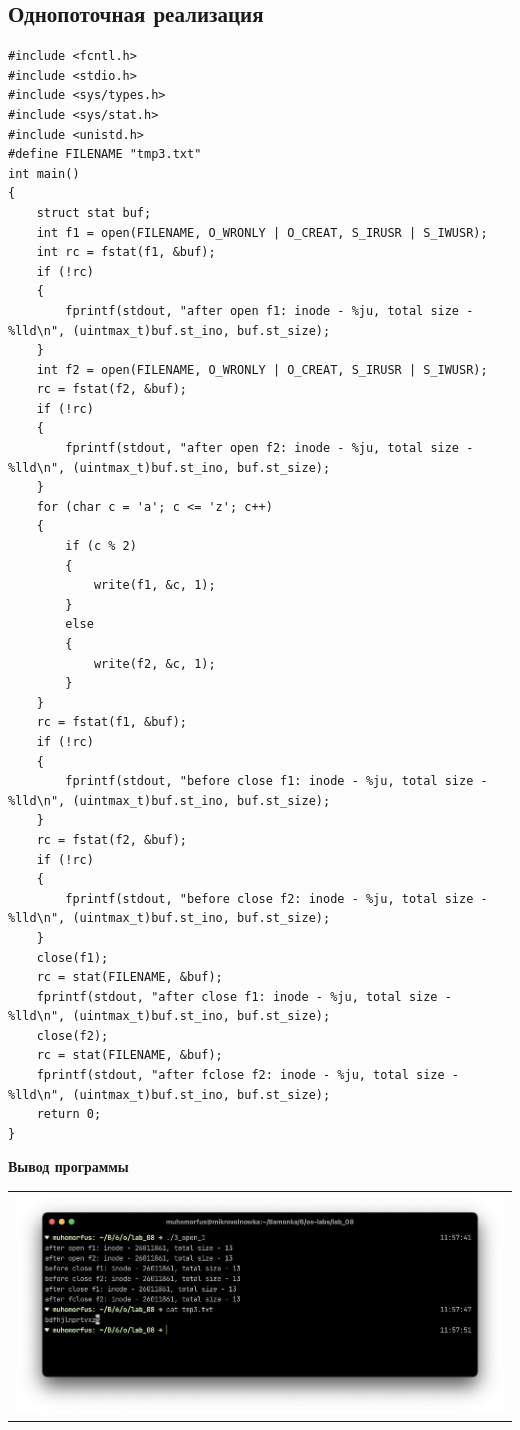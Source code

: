 \subsection{Однопоточная реализация}

\begin{lstlisting}
#include <fcntl.h>
#include <stdio.h> 
#include <sys/types.h> 
#include <sys/stat.h>
#include <unistd.h>
#define FILENAME "tmp3.txt"
int main()
{
	struct stat buf;
	int f1 = open(FILENAME, O_WRONLY | O_CREAT, S_IRUSR | S_IWUSR);
	int rc = fstat(f1, &buf);
	if (!rc)
	{
		fprintf(stdout, "after open f1: inode - %ju, total size - %lld\n", (uintmax_t)buf.st_ino, buf.st_size);
	}
	int f2 = open(FILENAME, O_WRONLY | O_CREAT, S_IRUSR | S_IWUSR);
	rc = fstat(f2, &buf);
	if (!rc)
	{
		fprintf(stdout, "after open f2: inode - %ju, total size - %lld\n", (uintmax_t)buf.st_ino, buf.st_size);
	}
	for (char c = 'a'; c <= 'z'; c++)
	{
		if (c % 2)
		{
			write(f1, &c, 1);
		}
		else
		{
			write(f2, &c, 1); 
		}
	}
	rc = fstat(f1, &buf);
	if (!rc)
	{
		fprintf(stdout, "before close f1: inode - %ju, total size - %lld\n", (uintmax_t)buf.st_ino, buf.st_size);
	}
	rc = fstat(f2, &buf);
	if (!rc)
	{
		fprintf(stdout, "before close f2: inode - %ju, total size - %lld\n", (uintmax_t)buf.st_ino, buf.st_size);
	}
	close(f1);
	rc = stat(FILENAME, &buf);
	fprintf(stdout, "after close f1: inode - %ju, total size - %lld\n", (uintmax_t)buf.st_ino, buf.st_size);
	close(f2);
	rc = stat(FILENAME, &buf);
	fprintf(stdout, "after fclose f2: inode - %ju, total size - %lld\n", (uintmax_t)buf.st_ino, buf.st_size);
	return 0;
}
\end{lstlisting}

\textbf{Вывод программы}

 \begin{table}[H]
	\centering
	\begin{tabular}{p{1\linewidth}}
		\centering
		\includegraphics[width=0.9\linewidth]{./images/7.png}
	\end{tabular}
\end{table}

